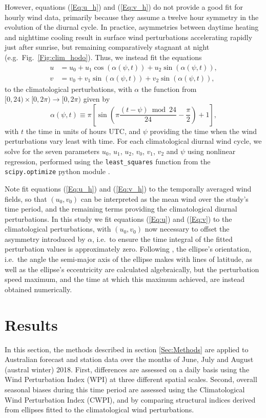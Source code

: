 \documentclass{ametsoc}
\begin{document}
However, equations (\ref{Eq:u_h}) and (\ref{Eq:v_h}) do not provide a good fit for hourly wind data, primarily because they assume a twelve hour symmetry in the evolution of the diurnal cycle. In practice, asymmetries between daytime heating and nighttime cooling \citep[e.g.][]{svensson11} result in surface wind perturbations accelerating rapidly just after sunrise, but remaining comparatively stagnant at night (e.g.~Fig.~\ref{Fig:clim_hodo}). Thus, we instead fit the equations
\begin{align}
u &= u_0 + u_1 \cos(\alpha(\psi,t)) + u_2 \sin(\alpha(\psi,t)), \label{Eq:u} \\
v &= v_0 + v_1 \sin(\alpha(\psi,t)) + v_2 \sin(\alpha(\psi,t)), \label{Eq:v}
\end{align}
to the climatological perturbations, with $\alpha$ the function from $[0,24) \times [0, 2\pi) \to [0, 2\pi)$ given by
\begin{equation}
\alpha(\psi,t) \equiv \pi \left[\sin\left( \pi \frac{(t - \psi)  \bmod 24}{24} - \frac{\pi}{2} \right) + 1 \right], \label{Eq:alpha}
\end{equation}
with $t$ the time in units of hours UTC, and $\psi$ providing the time when the wind perturbations vary least with time. For each climatological diurnal wind cycle, we solve for the seven parameters $u_0$, $u_1$, $u_2$, $v_0$, $v_1$, $v_2$ and $\psi$ using nonlinear regression, performed using the \texttt{least\_squares} function from the \texttt{scipy.optimize} python module \citep{scipy19}.

Note \citet{gille05} fit equations (\ref{Eq:u_h}) and (\ref{Eq:v_h}) to the temporally averaged wind fields, so that $\left(u_0, v_0\right)$ can be interpreted as the mean wind over the study's time period, and the remaining terms providing the climatological diurnal perturbations. In this study we fit equations (\ref{Eq:u}) and (\ref{Eq:v}) to the climatological perturbations, with $\left(u_0, v_0\right)$ now necessary to offset the asymmetry introduced by $\alpha$, i.e.~to ensure the time integral of the fitted perturbation values is approximately zero. Following \citet{gille05}, the ellipse's orientation, i.e.~the angle the semi-major axis of the ellipse makes with lines of latitude, as well as the ellipse's eccentricity are calculated algebraically, but the perturbation speed maximum, and the time at which this maximum achieved, are instead obtained numerically.

\section{Results}
\label{Sec:Results}
In this section, the methods described in section \ref{Sec:Methods} are applied to Australian forecast and station data over the months of June, July and August (austral winter) 2018. First, differences are assessed on a daily basis using the Wind Perturbation Index (WPI) at three different spatial scales. Second, overall seasonal biases during this time period are assessed using the Climatological Wind Perturbation Index (CWPI), and by comparing structural indices derived from ellipses fitted to the climatological wind perturbations. 
\end{document}
